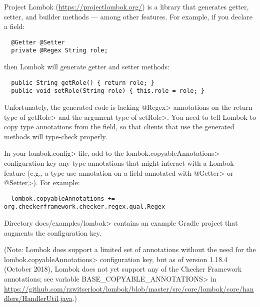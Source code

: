 
Project Lombok (\url{https://projectlombok.org/}) is a library that
generates getter, setter, and builder methods --- among other features.
For example, if you declare
a field:

\begin{Verbatim}
  @Getter @Setter
  private @Regex String role;
\end{Verbatim}

\noindent
then Lombok will generate getter and setter methods:

\begin{Verbatim}
  public String getRole() { return role; }
  public void setRole(String role) { this.role = role; }
\end{Verbatim}

Unfortunately, the generated code is lacking \<@Regex> annotations on
the return type of \<getRole> and the argument type of \<setRole>.
You need to tell Lombok to copy type annotations from the field, so that
clients that use the generated methods will type-check properly.

In your \<lombok.config> file, add to the \<lombok.copyableAnnotations>
configuration key any type annotations that might interact with a
Lombok feature (e.g., a type use annotation on a field annotated with
\<@Getter> or \<@Setter>).  For example:

\begin{Verbatim}
  lombok.copyableAnnotations += org.checkerframework.checker.regex.qual.Regex
\end{Verbatim}

Directory \<docs/examples/lombok> contains an example Gradle project that
augments the configuration key.

(Note:
Lombok does support a limited set of annotations without the need for the
\<lombok.copyableAnnotations> configuration key, but as of version 1.18.4
(October 2018),
Lombok does not yet support any of the Checker Framework annotations; see variable
\<BASE\_COPYABLE\_ANNOTATIONS> in
\url{https://github.com/rzwitserloot/lombok/blob/master/src/core/lombok/core/handlers/HandlerUtil.java}.)


